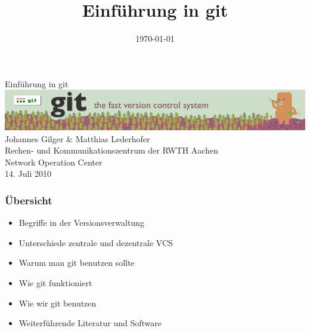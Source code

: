 
 {
}

\usepackage[german]{babel}
\usepackage[utf8]{inputenc}
\usepackage{times}
\usepackage[T1]{fontenc}
\usepackage[right]{eurosym}
\usepackage{graphicx}
\usepackage{hyperref}
\hypersetup{pdftex=true, colorlinks=true, breaklinks=true, linkcolor=darkblue, menucolor=darkblue, pagecolor=darkblue, urlcolor=darkblue}

\title[Einführung in git]{Einführung in git}
\author[Gilger, Lederhofer]{}
\date[\today]{\today}



\begin{frame}
  \begin{center}
  \vspace{1cm}
  \Huge Einführung in git \\
  \vspace{1cm}
  \includegraphics[scale=0.4]{img/git-logo.png} \\
  \vspace{0.6cm}
  \Large Johannes Gilger \& Matthias Lederhofer \\
  \small Rechen- und Kommunikationszentrum der RWTH Aachen \\
  \small Network Operation Center \\
  \vspace{1cm}
  \small 14. Juli 2010
  \end{center}
\end{frame}

\begin{frame}
  \frametitle{Übersicht}
  \begin{itemize}
    \item Begriffe in der Versionsverwaltung
    \item Unterschiede zentrale und dezentrale VCS
    \item Warum man git benutzen sollte
    \item Wie git funktioniert
    \item Wie wir git benutzen
    \item Weiterführende Literatur und Software
  \end{itemize}
\end{frame}


